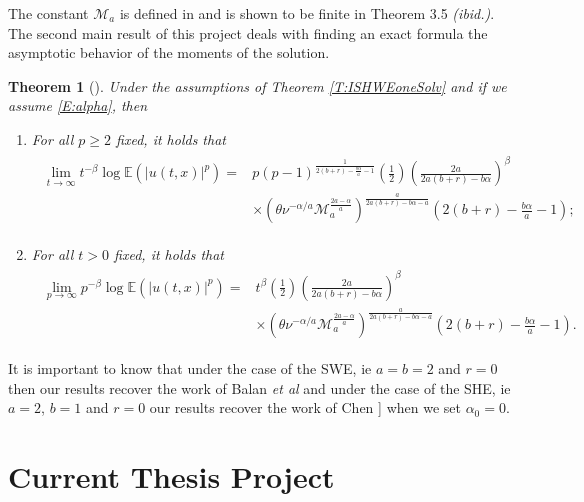 \documentclass[a4paper,11pt]{article}
\numberwithin{equation}{section}
\theoremstyle{plain}
\newtheorem{theorem}{Theorem}[section]
\theoremstyle{definition}
\newcommand{\E}{\mathbb{E}}
\numberwithin{NQ}{section}
\numberwithin{LQ}{section}
\numberwithin{ZQ}{section}
\begin{document}
The constant $\mathcal{M}_a$ is defined in \cite[Equation (3.11)]{CE21} and is shown to be finite in Theorem 3.5 {\it (ibid.)}. The second main result of this project deals with finding an exact formula the asymptotic behavior of the moments of the solution. 

\begin{theorem}[]
Under the assumptions of Theorem \ref{T:ISHWEoneSolv} and if we assume \eqref{E:alpha}, then
	\begin{enumerate}
		\item  For all $p\ge 2$ fixed, it holds that
		\begin{align}
		\label{E:momentasym-t}
		\begin{aligned}
		\lim_{t \to \infty} t^{-\beta} \log \E\left(|u(t,x)|^p\right) = &  p(p-1)^{\frac{1}{2(b+r)-\frac{b\alpha}{a} -1}} \left(\frac{1}{2}\right)\left(\frac{2a}{2a(b+r)- b\alpha} \right)^\beta \\
		& \times \left(\theta\nu^{-\alpha/a} \mathcal{M}_a^{\frac{2a-\alpha}{a}}\right)^{\frac{a}{2a(b+r)-b\alpha-a}}\left(2(b+r)-\frac{b\alpha}{a}-1\right);
		\end{aligned}
		\end{align}
		\item For all $t>0$ fixed, it holds that
		\begin{align}
		\label{E:momentasym-p}
		\begin{aligned}
		\lim_{p \to \infty} p^{-\beta} \log \E\left(|u(t,x)|^p\right) = & t^\beta \left(\frac{1}{2}\right)\left(\frac{2a}{2a(b+r)- b\alpha} \right)^\beta \\
		& \times \left(\theta\nu^{-\alpha/a} \mathcal{M}_a^{\frac{2a-\alpha}{a}}\right)^{\frac{a}{2a(b+r)-b\alpha-a}}\left(2(b+r)-\frac{b\alpha}{a}-1\right).
		\end{aligned}
		\end{align}
	\end{enumerate}
\end{theorem}

It is important to know that under the case of the SWE, ie $a=b=2$ and $r=0$ then our results recover the work of Balan {\it et al} \cite{BCC21} and under the case of the SHE, ie $a=2$, $b=1$ and $r=0$ our results recover the work of Chen \cite[Theorem 1.1 and Theorem 1.2]{Chen19AIHP}] when we set $\alpha_0=0$. 

\section{Current Thesis Project}
\end{document}
